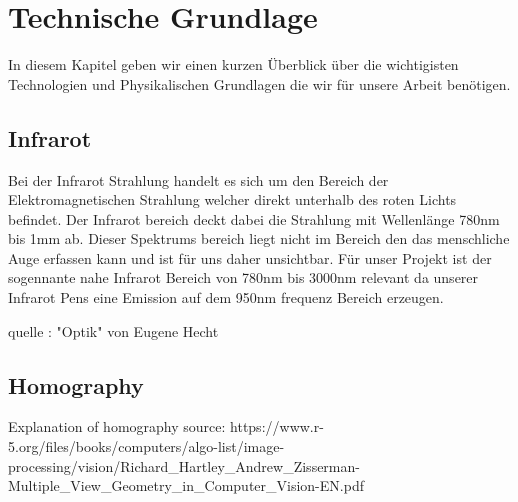 \section{Technische Grundlage}
In diesem Kapitel geben wir einen kurzen Überblick über die wichtigisten Technologien und Physikalischen Grundlagen die wir für unsere Arbeit benötigen.
\subsection{Infrarot}
Bei der Infrarot Strahlung handelt es sich um den Bereich der Elektromagnetischen Strahlung welcher direkt unterhalb des roten Lichts befindet. Der Infrarot bereich deckt dabei die Strahlung mit Wellenlänge 780nm bis 1mm ab. Dieser Spektrums bereich liegt nicht im Bereich den das menschliche Auge erfassen kann und ist für uns daher unsichtbar. Für unser Projekt ist der sogennante nahe Infrarot Bereich von 780nm bis 3000nm relevant da unserer Infrarot Pens eine Emission auf dem 950nm frequenz Bereich erzeugen.

quelle : "Optik" von Eugene Hecht

\subsection{Homography}

Explanation of homography source:
https://www.r-5.org/files/books/computers/algo-list/image-processing/vision/Richard_Hartley_Andrew_Zisserman-Multiple_View_Geometry_in_Computer_Vision-EN.pdf